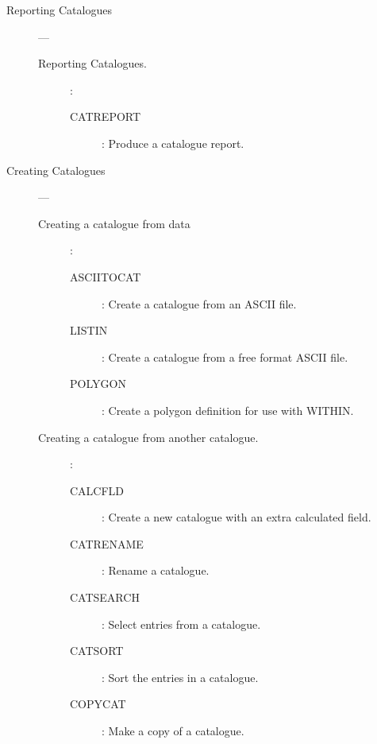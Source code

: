 \begin{description}

\item [Reporting Catalogues] ---

\begin{description}

\item [Reporting Catalogues.]:

\begin {description}

\item [CATREPORT]:
 Produce a catalogue report.

\end{description}
\end{description}

\item [Creating Catalogues] ---

\begin{description}

\item [Creating a catalogue from data]:

\begin {description}

\item [ASCIITOCAT]:
 Create a catalogue from an ASCII file.

\item [LISTIN]:
 Create a catalogue from a free format ASCII file.

\item [POLYGON]:
 Create a polygon definition for use with WITHIN.

\end{description}

\item [Creating a catalogue from another catalogue.] :

\begin{description}

\item [CALCFLD]:
 Create a new catalogue with an extra calculated field.

\item [CATRENAME]:
 Rename a catalogue.

\item [CATSEARCH]:
 Select entries from a catalogue.

\item [CATSORT]:
 Sort the entries in a catalogue.

\item [COPYCAT]:
 Make a copy of a catalogue.


\end{description}
\end{description}
\end{description}
